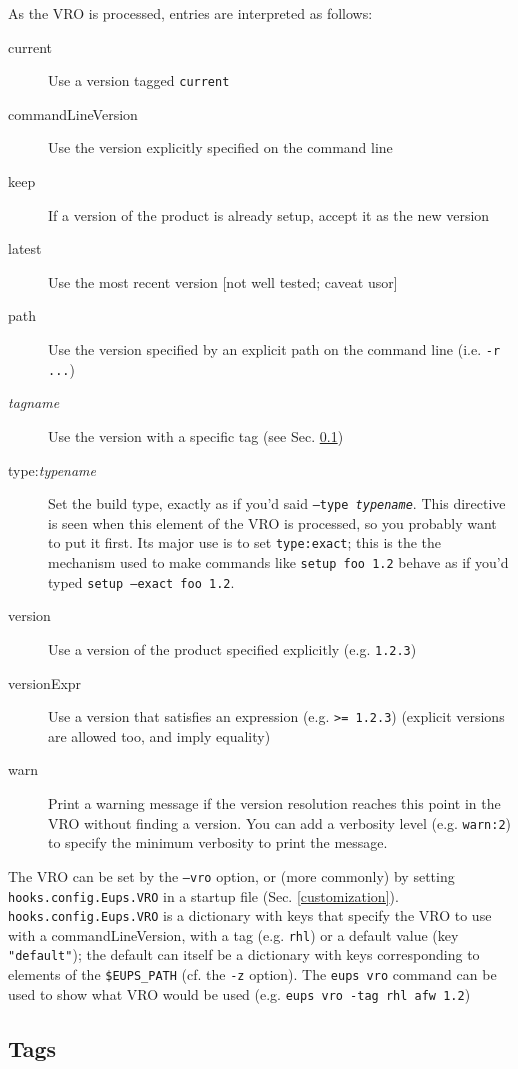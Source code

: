 \documentclass{article}
\newcommand{\code}[1]{\texttt{#1}}
\begin{document}
As the VRO is processed, entries are interpreted as follows:
\begin{description}
\item[current]
   Use a version tagged \code{current}
\item[commandLineVersion]
   Use the version explicitly specified on the command line
\item[keep]
   If a version of the product is already setup, accept it as the new version
\item[latest]
   Use the most recent version [not well tested; caveat usor]
\item[path]
   Use the version specified by an explicit path on the command line (i.e. \code{-r ...})
\item[\textit{tagname}]
   Use the version with a specific tag (see Sec. \ref{tags})
\item[type:\textit{typename}]
   Set the build type, exactly as if you'd said \code{--type \textit{typename}}.  This directive is seen
   when this element of the VRO is processed, so you probably want to put it first.  Its major use is to
   set \code{type:exact};  this is the the mechanism used to make commands like \code{setup foo 1.2}
   behave as if you'd typed \code{setup --exact foo 1.2}.
\item[version]
   Use a version of the product specified explicitly (e.g. \code{1.2.3})
\item[versionExpr]
   Use a version that satisfies an expression (e.g. \code{>= 1.2.3})
   (explicit versions are allowed too, and imply equality)
\item[warn]
   Print a warning message if the version resolution reaches this point in the VRO without finding a version.
   You can add a verbosity level (e.g. \code{warn:2}) to specify the minimum verbosity to print the message.
\end{description}

The VRO can be set by the \code{--vro} option, or (more commonly) by setting \code{hooks.config.Eups.VRO}
in a startup file (Sec. \ref{customization}).  \code{hooks.config.Eups.VRO} is a dictionary with
keys that specify the VRO to use with a commandLineVersion, with a tag (e.g. \code{rhl}) or a default value (key \code{"default"});
the default can itself be a dictionary with keys corresponding to elements of the \code{\$EUPS\_PATH} (cf. the
\code{-z} option).  The \code{eups vro} command can be used to show what VRO would be used (e.g. \code{eups vro -tag rhl afw 1.2})

\subsection{Tags}
\label{tags}
\end{document}

